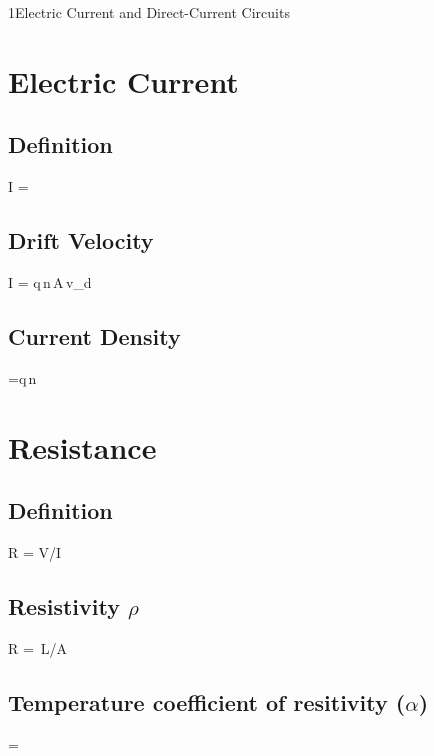 \documentclass[\mainfilename]{subfiles}
\begin{document}
\begin{sectionBox}1{Electric Current and Direct-Current Circuits} %
    
    \section*{Electric Current}

    \subsection{Definition}
    \begin{BM}
        I = 
    \end{BM}

    \subsection{Drift Velocity}
    \begin{BM}
        I = q\,n\,A\,v_d
    \end{BM}

    \subsection{Current Density}
    \begin{BM}
        =q\,n\,
    \end{BM}

    \section*{Resistance}

    \subsection{Definition}
    \begin{BM}
        R = V/I
    \end{BM}

    \subsection{Resistivity \(\rho\)}
    \begin{BM}
        R = \rho\,L/A
    \end{BM}

    \subsection{Temperature coefficient of resitivity (\(\alpha\))}
    \begin{BM}
        \alpha
        = 
    \end{BM}


\end{sectionBox}
\end{document}
